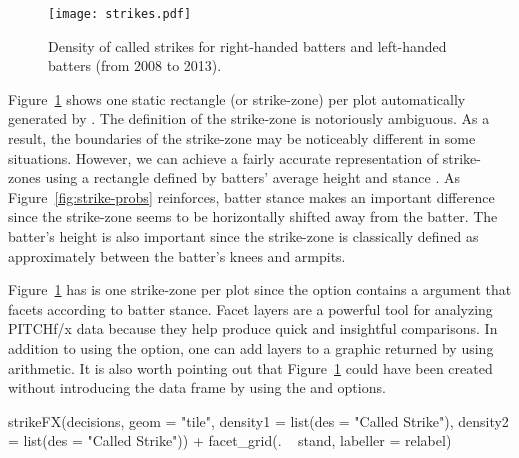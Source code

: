 \begin{article}
\begin{figure}[h]
\centerline{\texttt{[image: strikes.pdf]}}
\caption{\label{fig:STRIKES} Density of called strikes for right-handed batters
and left-handed batters (from 2008 to 2013).}
\end{figure}


Figure~\ref{fig:STRIKES} shows one static rectangle (or strike-zone)
per plot automatically generated by . The definition
of the strike-zone is notoriously ambiguous. As a result, the boundaries
of the strike-zone may be noticeably different in some situations.
However, we can achieve a fairly accurate representation of strike-zones
using a rectangle defined by batters' average height and stance \citep{Strikezones}.
As Figure~\ref{fig:strike-probs} reinforces, batter stance makes
an important difference since the strike-zone seems to be horizontally
shifted away from the batter. The batter's height is also important
since the strike-zone is classically defined as approximately between
the batter's knees and armpits.

Figure~\ref{fig:STRIKES} has is one strike-zone per plot since the
 option contains a  argument that facets
according to batter stance. Facet layers are a powerful tool for analyzing
PITCHf/x data because they help produce quick and insightful comparisons.
In addition to using the  option, one can add layers
to a graphic returned by  using  arithmetic.
It is also worth pointing out that Figure~\ref{fig:STRIKES} could
have been created without introducing the  data frame
by using the  and  options. 
%
\begin{Schunk}
\begin{Sinput}
strikeFX(decisions, geom = "tile", density1 = list(des = "Called Strike"),          
  density2 = list(des = "Called Strike")) + facet_grid(. ~ stand, labeller = relabel)
\end{Sinput}
\end{Schunk}
%


\end{article}
